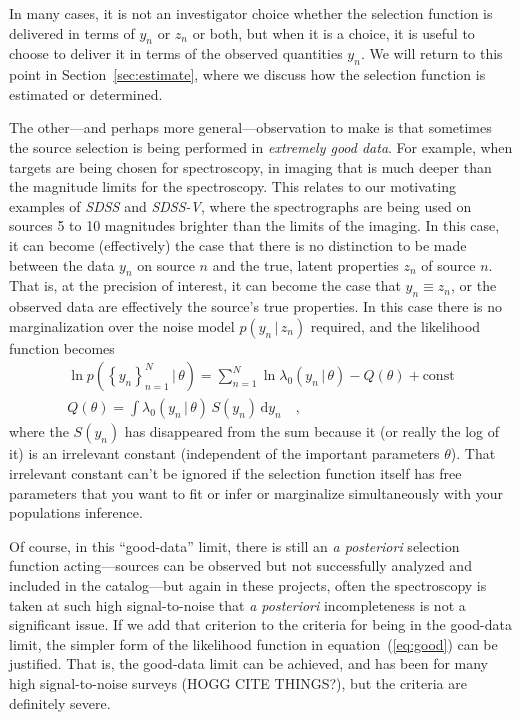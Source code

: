 \documentclass[modern]{aastex62}
\newcommand{\dd}{\mathrm{d}}
\newcommand{\given}{\,|\,}
\newcommand{\set}[1]{\left\{{#1}\right\}}
\newcommand{\sectionname}{Section}
\newcommand{\equationname}{equation}
\newcommand{\project}[1]{\textsl{#1}}
\newcommand{\foreign}[1]{\textsl{#1}}
\begin{document}
In many cases, it is not an investigator choice whether the selection
function is delivered in terms of $y_n$ or $z_n$ or both, but when it
is a choice, it is useful to choose to deliver it in terms of the
observed quantities $y_n$.
We will return to this point in \sectionname~\ref{sec:estimate}, where
we discuss how the selection function is estimated or determined.

The other---and perhaps more general---observation to make is that
sometimes the source selection is being performed in \emph{extremely
  good data}.
For example, when targets are being chosen for spectroscopy, in
imaging that is much deeper than the magnitude limits for the
spectroscopy.
This relates to our motivating examples of \project{SDSS} and
\project{SDSS-V}, where the spectrographs are being used on sources 5
to 10 magnitudes brighter than the limits of the imaging.
In this case, it can become (effectively) the case that there is no
distinction to be made between the data $y_n$ on source $n$ and the
true, latent properties $z_n$ of source $n$.
That is, at the precision of interest, it can become the case that
$y_n\equiv z_n$, or the observed data are effectively the source's
true properties.
In this case there is no marginalization over the noise model
$p(y_n\given z_n)$ required, and the likelihood function becomes
\begin{gather}
\ln p(\set{y_n}_{n=1}^{N}\given\theta)
 = \sum_{n=1}^N \ln\lambda_0(y_n\given \theta) - Q(\theta) + \mbox{const}
\label{eq:good}
\\
Q(\theta) = \int\lambda_0(y_n\given \theta)\,S(y_n)\,\dd y_n
\quad ,
\end{gather}
where the $S(y_n)$ has disappeared from the sum because it (or really
the log of it) is an irrelevant constant (independent of the important
parameters $\theta$).
That irrelevant constant can't be ignored if the selection function
itself has free parameters that you want to fit or infer or
marginalize simultaneously with your populations inference.

Of course, in this ``good-data'' limit, there is still an
\foreign{a posteriori} selection function acting---sources can be
observed but not successfully analyzed and included in the
catalog---but again in these projects, often the spectroscopy is taken
at such high signal-to-noise that \foreign{a posteriori}
incompleteness is not a significant issue.
If we add that criterion to the criteria for being in the good-data
limit, the simpler form of the likelihood function in
\equationname~(\ref{eq:good}) can be justified.
That is, the good-data limit can be achieved, and has been for many
high signal-to-noise surveys (HOGG CITE THINGS?), but the criteria
are definitely severe.
\end{document}
